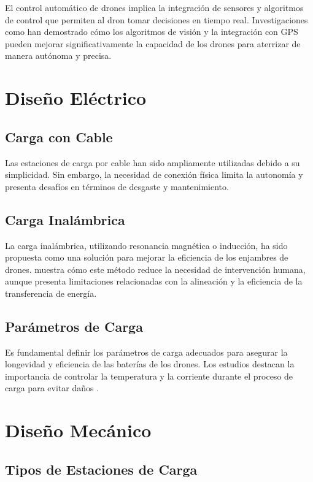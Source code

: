 El control automático de drones implica la integración de sensores y algoritmos de control que permiten al dron tomar decisiones en tiempo real. Investigaciones como \cite{Lee2021} han demostrado cómo los algoritmos de visión y la integración con GPS pueden mejorar significativamente la capacidad de los drones para aterrizar de manera autónoma y precisa.

\section{Diseño Eléctrico}

\subsection{Carga con Cable}

Las estaciones de carga por cable han sido ampliamente utilizadas debido a su simplicidad. Sin embargo, la necesidad de conexión física limita la autonomía y presenta desafíos en términos de desgaste y mantenimiento.

\subsection{Carga Inalámbrica}

La carga inalámbrica, utilizando resonancia magnética o inducción, ha sido propuesta como una solución para mejorar la eficiencia de los enjambres de drones. \cite{Shen2019} muestra cómo este método reduce la necesidad de intervención humana, aunque presenta limitaciones relacionadas con la alineación y la eficiencia de la transferencia de energía.

\subsection{Parámetros de Carga}

Es fundamental definir los parámetros de carga adecuados para asegurar la longevidad y eficiencia de las baterías de los drones. Los estudios destacan la importancia de controlar la temperatura y la corriente durante el proceso de carga para evitar daños \cite{Kumar2022}.

\section{Diseño Mecánico}

\subsection{Tipos de Estaciones de Carga}

